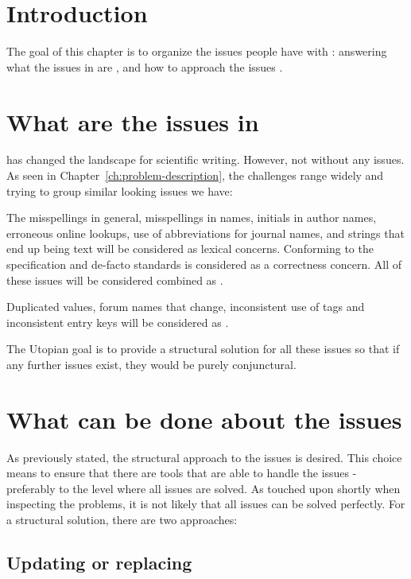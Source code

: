 \section{Introduction}

The goal of this chapter is to organize the issues people have with
{\bibtex}: answering what the issues in {\bibtex} are
, and how to approach the {\bibtex}
issues .


\section{What are the issues in {\bibtex}}
\label{sec:intro_what_issues}

{\bibtex} has changed the landscape for scientific writing.  However,
not without any issues.  As seen in
Chapter~\ref{ch:problem-description}, the challenges range widely and
trying to group similar looking issues we have:

The misspellings in general, misspellings in names, initials in author
names, erroneous online lookups, use of abbreviations for journal
names, and {\bibtex} strings that end up being text will be considered
as lexical concerns.  Conforming to the specification and de-facto
standards is considered as a correctness concern.  All of these issues
will be considered combined as .

Duplicated values, forum names that change, inconsistent use of tags
and inconsistent entry keys will be considered as .

The Utopian goal is to provide a structural solution for all these
issues so that if any further issues exist, they would be purely
conjunctural.


\section{What can be done about the {\bibtex} issues}
\label{sec:intro_what_to_do}

As previously stated, the structural approach to the issues is
desired.  This choice means to ensure that there are tools that are
able to handle the issues - preferably to the level where all issues
are solved.  As touched upon shortly when inspecting the problems, it
is not likely that all issues can be solved perfectly.  For a
structural solution, there are two approaches:


\subsection{Updating or replacing {\bibtex}}

